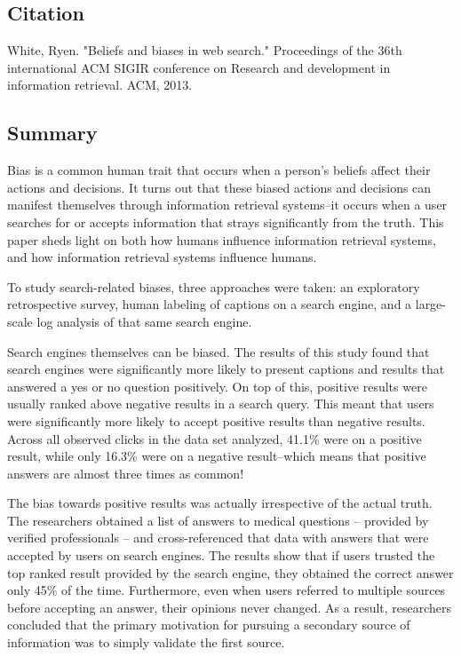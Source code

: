\documentclass[../summaries.tex]{subfiles}
\begin{document}
\subsection{Citation}
White, Ryen. "Beliefs and biases in web search." Proceedings of the 36th international ACM SIGIR conference on Research and development in information retrieval. ACM, 2013.

\subsection{Summary}
Bias is a common human trait that occurs when a person's beliefs affect their actions and decisions. It turns out that these biased actions and decisions can manifest themselves through information retrieval systems--it occurs when a user searches for or accepts information that strays significantly from the truth. This paper sheds light on both how humans influence information retrieval systems, and how information retrieval systems influence humans.

To study search-related biases, three approaches were taken: an exploratory retrospective survey, human labeling of captions on a search engine, and a large-scale log analysis of that same search engine.

Search engines themselves can be biased. The results of this study found that search engines were significantly more likely to present captions and results that answered a yes or no question positively. On top of this, positive results were usually ranked above negative results in a search query. This meant that users were significantly more likely to accept positive results than negative results. Across all observed clicks in the data set analyzed, 41.1\% were on a positive result, while only 16.3\% were on a negative result--which means that positive answers are almost three times as common!

The bias towards positive results was actually irrespective of the actual truth. The researchers obtained a list of answers to medical questions -- provided by verified professionals -- and cross-referenced that data with answers that were accepted by users on search engines. The results show that if users trusted the top ranked result provided by the search engine, they obtained the correct answer only 45\% of the time. Furthermore, even when users referred to multiple sources before accepting an answer, their opinions never changed. As a result, researchers concluded that the primary motivation for pursuing a secondary source of information was to simply validate the first source.
\end{document}
